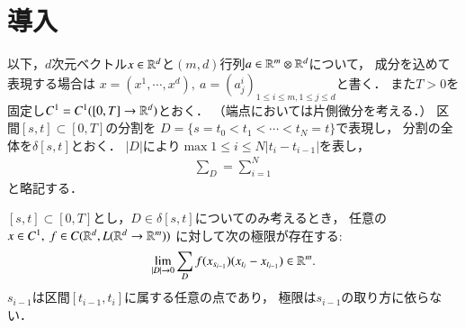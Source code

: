 \section{導入}
	以下，$d$次元ベクトル$x \in \mathbb{R}^d$と$(m, d)$行列$a \in \mathbb{R}^m \otimes \mathbb{R}^d$について，
	成分を込めて表現する場合は
	$x = (x^1,\cdots,x^d),\ a=(a^i_j)_{1 \leq i \leq m,1 \leq j \leq d}$と書く．
	また$T > 0$を固定し$C^1 = C^1([0,T] \rightarrow \mathbb{R}^d)$とおく．
	（端点においては片側微分を考える．）
	区間$[s,t] \subset [0,T]$の分割を
	$D = \{s = t_0 < t_1 < \cdots < t_N = t\}$で表現し，
	分割の全体を$\delta[s,t]$とおく．
	$|D|$により$\max{1 \leq i \leq N}{\left| t_i - t_{i-1} \right|}$を表し，
	\begin{align}
		\sum_D = \sum_{i=1}^{N}
	\end{align}
	と略記する．

	\begin{screen}
		\begin{thm}\label{thm:existence_of_Riemann_Stieltjes_integral}
			$[s,t] \subset [0,T]$とし，$D \in \delta[s,t]$についてのみ考えるとき，
			任意の$x \in C^1,\ f \in C(\mathbb{R}^d,L(\mathbb{R}^d \rightarrow \mathbb{R}^m))$
			に対して次の極限が存在する:\footnotemark
			\begin{align}
				\lim_{|D| \to 0}
				\sum_{D} f(x_{s_{i-1}})(x_{t_i} - x_{t_{i-1}})
				\in \mathbb{R}^m.
			\end{align}
			$s_{i-1}$は区間$[t_{i-1},t_i]$に属する任意の点であり，
			極限は$s_{i-1}$の取り方に依らない．
		\end{thm}
	\end{screen}
